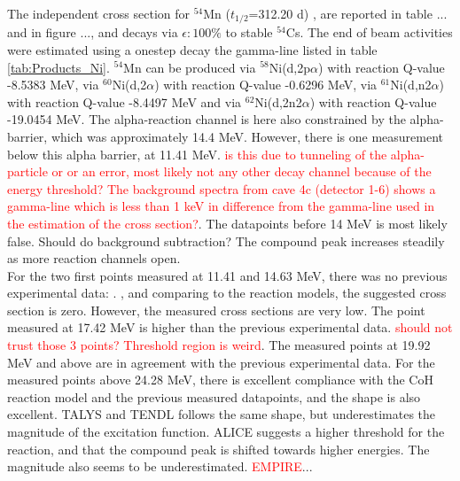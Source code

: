 \subsubsection{}
The independent cross section for $^{54}$Mn ($t_{1/2}$=312.20 d) \cite{Dong2014}, are reported in table ... and in figure ..., and decays via $\epsilon:100\%$ to stable $^{54}$Cs. The end of beam activities were estimated using a onestep decay the gamma-line listed in table \ref{tab:Products_Ni}. $^{54}$Mn can be produced via $^{58}$Ni(d,2p$\alpha$) with reaction Q-value -8.5383 MeV, via $^{60}$Ni(d,2$\alpha$) with reaction Q-value -0.6296 MeV, via $^{61}$Ni(d,n2$\alpha$) with reaction Q-value -8.4497 MeV and via $^{62}$Ni(d,2n2$\alpha$) with reaction Q-value -19.0454 MeV. The alpha-reaction channel is here also constrained by the alpha-barrier, which was approximately 14.4 MeV. However, there is one measurement below this alpha barrier, at 11.41 MeV. \textcolor{red}{is this due to tunneling of the alpha-particle or or an error, most likely not any other decay channel because of the energy threshold? The background spectra from cave 4c (detector 1-6) shows a gamma-line which is less than 1 keV in difference from the gamma-line used in the estimation of the cross section?}. The datapoints before 14 MeV is most likely false. Should do background subtraction? The compound peak increases steadily as more reaction channels open. \\ 
\noindent 
For the two first points measured at 11.41 and 14.63 MeV, there was no previous experimental data: \cite{Hermanne2013, Takacs2007, Usman2016,  Amjed2013}. , and comparing to the reaction models, the suggested cross section is zero. However, the measured cross sections are very low. The point measured at 17.42 MeV is higher than the previous experimental data. \textcolor{red}{should not trust those 3 points? Threshold region is weird}. The measured points at 19.92 MeV and above are in agreement with the previous experimental data. For the measured points above 24.28 MeV, there is excellent compliance with the CoH reaction model and the previous measured datapoints, and the shape is also excellent. TALYS and TENDL follows the same shape, but underestimates the magnitude of the excitation function. ALICE suggests a higher threshold for the reaction, and that the compound peak is shifted towards higher energies. The magnitude also seems to be underestimated. \textcolor{red}{EMPIRE}...


